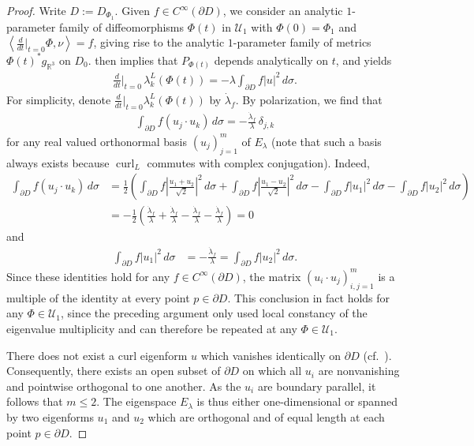 \documentclass[11pt,reqno]{amsart}
\DeclareMathOperator{\curl}{curl}
\begin{document}
\begin{proof}
    Write $D := D_{\Phi_1}$. Given $f \in  C^\infty(\partial D)$, we consider an analytic $1$-parameter family of diffeomorphisms $\Phi(t)$ in $\mathcal U_1$ with $\Phi(0) = \Phi_1$ and $\left\langle \frac{d}{dt}|_{t=0} \Phi, \nu \right\rangle = f$, giving rise to the analytic $1$-parameter family of metrics $\Phi(t)^\ast g_{\mathbb R^3}$ on $D_0$.  then implies that $P_{\Phi(t)}$ depends analytically on $t$, and  yields
    \begin{align*}
        \frac{d}{dt}\vert_{t=0} \, \lambda_k^L(\Phi(t)) = - \lambda \int_{\partial D} f|u|^2\,d\sigma.
    \end{align*}
    For simplicity, denote $\frac{d}{dt}\vert_{t=0}\lambda_k^L(\Phi(t))$ by $\dot\lambda_f$. By polarization, we find that
    \begin{align*}
        \int_{\partial D} f\left( u_j \cdot u_k \right) \,d\sigma = - \frac{\dot\lambda_f}{\lambda} \, \delta_{j,k}
    \end{align*}
    for any real valued orthonormal basis $(u_j)_{j=1}^m$ of $E_\lambda$ (note that such a basis always exists because $\curl_L$ commutes with complex conjugation). Indeed, 
    \begin{align*}
        \int_{\partial D} f \left( u_j \cdot u_k \right) \,d\sigma &= \frac12 \left( \int_{\partial D} f\left|\tfrac{u_1+u_2}{\sqrt2}\right|^2\,d\sigma + \int_{\partial D} f\left|\tfrac{u_1-u_2}{\sqrt2}\right|^2\,d\sigma - \int_{\partial D} f|u_1|^2\,d\sigma - \int_{\partial D} f|u_2|^2\,d\sigma \right) \\
        &=  - \frac12 \left( \frac{\dot\lambda_f}{\lambda} + \frac{\dot\lambda_f}{\lambda} - \frac{\dot\lambda_f}{\lambda} - \frac{\dot\lambda_f}{\lambda} \right) = 0
    \end{align*}
and
    \begin{align*}
        \int_{\partial D} f|u_1|^2\,d\sigma &= -\frac{\dot\lambda_f}{\lambda} = \int_{\partial D} f|u_2|^2\,d\sigma.
    \end{align*}
    Since these identities hold for any $f\in C^\infty (\partial D)$, the matrix $\left( u_i \cdot u_j \right)_{i,j = 1}^m$ is a multiple of the identity at every point $p \in \partial D$. This conclusion in fact holds for any $\Phi \in \mathcal U_1$, since the preceding argument only used local constancy of the eigenvalue multiplicity and can therefore be repeated at any $\Phi \in \mathcal U_1$.

    There does not exist a curl eigenform $u$ which vanishes identically on $\partial D$ (cf.\ \cite[proof of Proposition 2.1]{EncisoPeralta2020}). Consequently, there exists an open subset of $\partial D$ on which all $u_i$ are nonvanishing and pointwise orthogonal to one another. As the $u_i$ are boundary parallel, it follows that $m \leq 2$. The eigenspace $E_\lambda$ is thus either one-dimensional or spanned by two eigenforms $u_1$ and $u_2$ which are orthogonal and of equal length at each point $p \in \partial D$. 


\end{proof}
\end{document}
